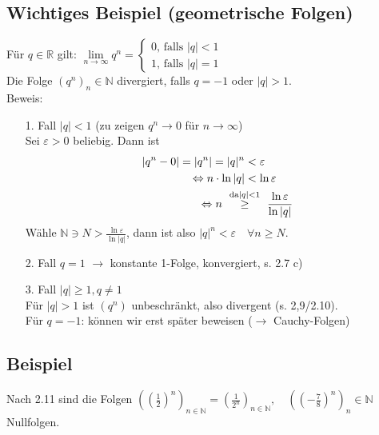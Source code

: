 \documentclass[12pt, titlepage]{article}
\newcommand{\R}{\mathds{R}}
\newcommand{\N}{\mathds{N}}
\newcommand{\infn}{n\rightarrow\infty}
\renewcommand{\>}{\rightarrow}
\renewcommand{\*}{\cdot}
\renewcommand{\epsilon}{\varepsilon}
\begin{document}
	\subsection{Wichtiges Beispiel (geometrische Folgen)}
	Für $q\in\R$ gilt: 
	$\lim\limits_{\infn}q^n=\begin{cases}
	0\textrm{, falls }|q|<1\\
	1\textrm{, falls }|q|=1
	\end{cases}$\\
	Die Folge $(q^n)_n\in\N$ divergiert, falls $q=-1$ oder $|q|>1$.\\
	Beweis: \begin{itemize}
		\item[1. Fall] $|q|<1$ (zu zeigen $q^n\> 0$ für $\infn$)\\
		Sei $\epsilon>0$ beliebig. Dann ist
		\begin{align*}
			|q^n-0|=|q^n|=|q|^n&<\epsilon\\
			\Leftrightarrow n\*\ln|q|&<\ln\epsilon\\
			\Leftrightarrow n \qquad &\mathclap{\overset{\textrm{da}|q|<1}{\geq}}\qquad \frac{\ln\epsilon}{\ln|q|}
		\end{align*}
		Wähle $\N\ni N>\frac{\ln\epsilon}{\ln|q|}$, dann ist also $|q|^n<\epsilon\quad\forall n\geq N$.
		\item[2. Fall] $q=1$ $\>$ konstante 1-Folge, konvergiert, s. 2.7 c)
		\item[3. Fall] $|q|\geq 1, q\neq 1$\\
		Für $|q|>1$ ist $(q^n)$ unbeschränkt, also divergent (s. 2,9/2.10).\\
		Für $q=-1$: können wir erst später beweisen ($\>$ Cauchy-Folgen)
	\end{itemize}
	\subsection{Beispiel}
	Nach 2.11 sind die Folgen $((\frac{1}{2})^n)_{n\in\N}=(\frac{1}{2^n})_{n\in\N},\quad ((-\frac{7}{8})^n)_n\in\N$ Nullfolgen.
\end{document}
